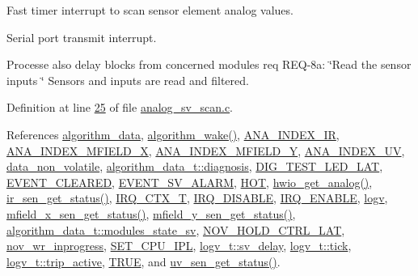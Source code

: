 Fast timer interrupt to scan sensor element analog values. 

Serial port transmit interrupt.

Processe also delay blocks from concerned modules req R\+E\+Q-\/8a\+: \char`\"{}\+Read the sensor inputs \char`\"{} Sensors and inputs are read and filtered.

Definition at line \hyperlink{a00041_source_l00025}{25} of file \hyperlink{a00041_source}{analog\+\_\+sv\+\_\+scan.\+c}.



References \hyperlink{a00038_source_l00033}{algorithm\+\_\+data}, \hyperlink{a00038_source_l00670}{algorithm\+\_\+wake()}, \hyperlink{a00058_source_l00026}{A\+N\+A\+\_\+\+I\+N\+D\+E\+X\+\_\+\+I\+R}, \hyperlink{a00058_source_l00027}{A\+N\+A\+\_\+\+I\+N\+D\+E\+X\+\_\+\+M\+F\+I\+E\+L\+D\+\_\+\+X}, \hyperlink{a00058_source_l00028}{A\+N\+A\+\_\+\+I\+N\+D\+E\+X\+\_\+\+M\+F\+I\+E\+L\+D\+\_\+\+Y}, \hyperlink{a00058_source_l00025}{A\+N\+A\+\_\+\+I\+N\+D\+E\+X\+\_\+\+U\+V}, \hyperlink{a00060_source_l00016}{data\+\_\+non\+\_\+volatile}, \hyperlink{a00016_a16f85d57ec98b4ad05f5a2e10536b3c6}{algorithm\+\_\+data\+\_\+t\+::diagnosis}, \hyperlink{a00058_source_l00051}{D\+I\+G\+\_\+\+T\+E\+S\+T\+\_\+\+L\+E\+D\+\_\+\+L\+A\+T}, \hyperlink{a00021_source_l00073}{E\+V\+E\+N\+T\+\_\+\+C\+L\+E\+A\+R\+E\+D}, \hyperlink{a00021_source_l00069}{E\+V\+E\+N\+T\+\_\+\+S\+V\+\_\+\+A\+L\+A\+R\+M}, \hyperlink{a00021_source_l00153}{H\+O\+T}, \hyperlink{a00056_source_l00223}{hwio\+\_\+get\+\_\+analog()}, \hyperlink{a00045_source_l00302}{ir\+\_\+sen\+\_\+get\+\_\+status()}, \hyperlink{a00033_source_l00017}{I\+R\+Q\+\_\+\+C\+T\+X\+\_\+\+T}, \hyperlink{a00033_source_l00020}{I\+R\+Q\+\_\+\+D\+I\+S\+A\+B\+L\+E}, \hyperlink{a00033_source_l00025}{I\+R\+Q\+\_\+\+E\+N\+A\+B\+L\+E}, \hyperlink{a00038_source_l00036}{logv}, \hyperlink{a00050_source_l00276}{mfield\+\_\+x\+\_\+sen\+\_\+get\+\_\+status()}, \hyperlink{a00019_ac7134882964fedc18be6c75547987a2c}{mfield\+\_\+y\+\_\+sen\+\_\+get\+\_\+status()}, \hyperlink{a00016_a293140e240bbd54f7601adbc9194148c}{algorithm\+\_\+data\+\_\+t\+::modules\+\_\+state\+\_\+sv}, \hyperlink{a00013_source_l00122}{N\+O\+V\+\_\+\+H\+O\+L\+D\+\_\+\+C\+T\+R\+L\+\_\+\+L\+A\+T}, \hyperlink{a00060_source_l00019}{nov\+\_\+wr\+\_\+inprogress}, \hyperlink{a00015_source_l08162}{S\+E\+T\+\_\+\+C\+P\+U\+\_\+\+I\+P\+L}, \hyperlink{a00021_a854b8f967c206a5f3e4aeaf91a782b3e}{logv\+\_\+t\+::sv\+\_\+delay}, \hyperlink{a00021_source_l00247}{logv\+\_\+t\+::tick}, \hyperlink{a00021_source_l00248}{logv\+\_\+t\+::trip\+\_\+active}, \hyperlink{a00040_source_l00084}{T\+R\+U\+E}, and \hyperlink{a00073_source_l00302}{uv\+\_\+sen\+\_\+get\+\_\+status()}.


